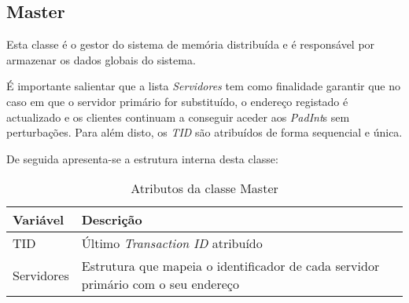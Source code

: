\subsection{Master}

Esta classe é o gestor do sistema de memória distribuída e é responsável por armazenar os dados globais do sistema. 

É importante salientar que a lista \textit{Servidores} tem como finalidade garantir que no caso em que o servidor primário for substituído, o endereço registado é actualizado e os clientes continuam a conseguir aceder aos \textit{PadInt}s sem perturbações. Para além disto, os \textit{TID} são atribuídos de forma sequencial e única. 

De seguida apresenta-se a estrutura interna desta classe:
\begin{table}[H]
\centering
\begin{tabular}{| p{} | p{6cm} |}
\hline
\textbf{Variável} & \textbf{Descrição} \\
\hline
TID & Último \textit{Transaction ID} atribuído \\
\hline
Servidores & Estrutura que mapeia o identificador de cada servidor primário com o seu endereço \\
\hline
\end{tabular}
\caption{Atributos da classe Master}
\end{table}
